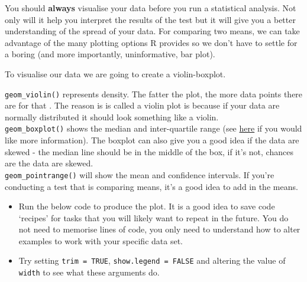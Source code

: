 \documentclass[]{book}
\providecommand{\tightlist}{%
  \setlength{\itemsep}{0pt}\setlength{\parskip}{0pt}}
\begin{document}
You should \textbf{always} visualise your data before you run a statistical analysis. Not only will it help you interpret the results of the test but it will give you a better understanding of the spread of your data. For comparing two means, we can take advantage of the many plotting options R provides so we don't have to settle for a boring (and more importantly, uninformative, bar plot).

To visualise our data we are going to create a violin-boxplot.

\texttt{geom\_violin()} represents density. The fatter the plot, the more data points there are for that . The reason is is called a violin plot is because if your data are normally distributed it should look something like a violin.\\
\texttt{geom\_boxplot()} shows the median and inter-quartile range (see \href{https://towardsdatascience.com/understanding-boxplots-5e2df7bcbd51}{here} if you would like more information). The boxplot can also give you a good idea if the data are skewed - the median line should be in the middle of the box, if it's not, chances are the data are skewed.\\
\texttt{geom\_pointrange()} will show the mean and confidence intervals. If you're conducting a test that is comparing means, it's a good idea to add in the means.

\begin{itemize}
\tightlist
\item
  Run the below code to produce the plot. It is a good idea to save code `recipes' for tasks that you will likely want to repeat in the future. You do not need to memorise lines of code, you only need to understand how to alter examples to work with your specific data set.
\item
  Try setting \texttt{trim\ =\ TRUE}, \texttt{show.legend\ =\ FALSE} and altering the value of \texttt{width} to see what these arguments do.
\end{itemize}
\end{document}
